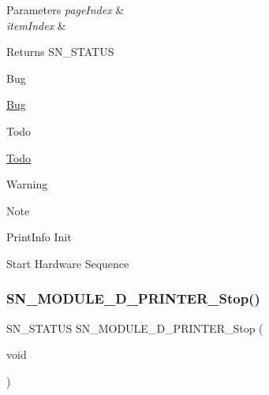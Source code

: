 \begin{DoxyParams}{Parameters}
{\em page\+Index} & \\
\hline
{\em item\+Index} & \\
\hline
\end{DoxyParams}
\begin{DoxyReturn}{Returns}
S\+N\+\_\+\+S\+T\+A\+T\+US 
\end{DoxyReturn}
\begin{DoxyRefDesc}{Bug}
\item[\hyperlink{bug__bug000004}{Bug}]\end{DoxyRefDesc}
\begin{DoxyRefDesc}{Todo}
\item[\hyperlink{todo__todo000004}{Todo}]\end{DoxyRefDesc}
\begin{DoxyWarning}{Warning}

\end{DoxyWarning}
\begin{DoxyNote}{Note}

\end{DoxyNote}
Print\+Info Init

Start Hardware Sequence \mbox{\label{group__D_ga21ca69a451fafe2c9218c9a1737e1f15}} 
\subsubsection{\texorpdfstring{S\+N\+\_\+\+M\+O\+D\+U\+L\+E\+\_\+D\+\_\+\+P\+R\+I\+N\+T\+E\+R\+\_\+\+Stop()}{SN\_MODULE\_3D\_PRINTER\_Stop()}}
{\footnotesize\ttfamily S\+N\+\_\+\+S\+T\+A\+T\+US S\+N\+\_\+\+M\+O\+D\+U\+L\+E\+\_\+D\+\_\+\+P\+R\+I\+N\+T\+E\+R\+\_\+\+Stop (\begin{DoxyParamCaption}\item[{void}]{ }\end{DoxyParamCaption})}


